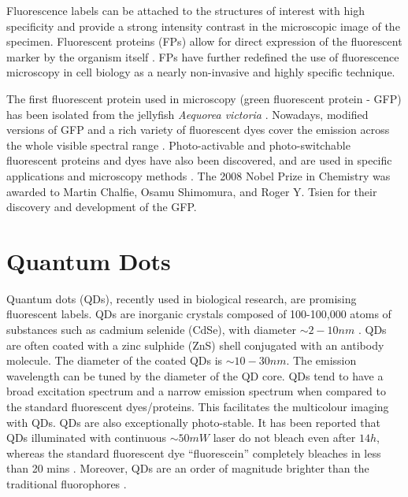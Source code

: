 Fluorescence labels can be attached to the structures of interest with high specificity and provide a strong intensity contrast in the microscopic image of the specimen. Fluorescent proteins (FPs) allow for direct expression of the fluorescent marker by the organism itself \cite{Fernandez-Suarez2008}. FPs have further redefined the use of fluorescence microscopy in cell biology as a nearly non-invasive and highly specific technique. 

The first fluorescent protein used in microscopy (green fluorescent protein - GFP) has been isolated from the jellyfish {\it Aequorea victoria} \cite{Tsien1998}. Nowadays, modified versions of GFP and a rich variety of fluorescent dyes cover the emission across the whole visible spectral range \cite{Fernandez-Suarez2008}. Photo-activable and photo-switchable fluorescent proteins and dyes have also been discovered, and are used in specific applications and microscopy methods \cite{Bock2007,Hirvonen2008, Rego2011a}. The 2008 Nobel Prize in Chemistry was awarded to Martin Chalfie, Osamu Shimomura, and Roger Y. Tsien for their discovery and development of the GFP.
 

\section{Quantum Dots\label{sec:Quantum-dots}}

Quantum dots (QDs), recently used in biological research, are promising fluorescent labels.  QDs are inorganic crystals composed of 100-100,000 atoms of substances such as cadmium selenide (CdSe), with diameter $\sim2-10\unit{nm}$ \cite{Alivisatos1996}. QDs are often coated with a zinc sulphide (ZnS) shell conjugated with an antibody molecule. The diameter of the coated QDs is $\sim10-30\unit{nm}$. The emission wavelength can be tuned by the diameter of the QD core. QDs tend to have a broad excitation spectrum and a narrow emission spectrum when compared to the standard fluorescent dyes/proteins. This facilitates the multicolour imaging with QDs. QDs are also exceptionally photo-stable. It has been reported that QDs illuminated with continuous $\sim 50\unit{mW}$ laser do not bleach even after $14\unit{h}$, whereas the standard fluorescent dye ``fluorescein'' completely bleaches in less than 20 mins \cite{Jaiswal2004}. Moreover, QDs are an order of magnitude brighter than the traditional fluorophores \cite{Resch-Genger2008,Walling2009}. 

